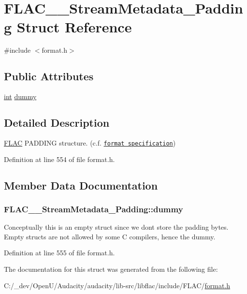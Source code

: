 \hypertarget{struct_f_l_a_c_____stream_metadata___padding}{}\section{F\+L\+A\+C\+\_\+\+\_\+\+Stream\+Metadata\+\_\+\+Padding Struct Reference}
\label{struct_f_l_a_c_____stream_metadata___padding}


{\ttfamily \#include $<$format.\+h$>$}

\subsection*{Public Attributes}
\begin{DoxyCompactItemize}
\item 
\hyperlink{xmltok_8h_a5a0d4a5641ce434f1d23533f2b2e6653}{int} \hyperlink{struct_f_l_a_c_____stream_metadata___padding_a5214437fcba7d6abdc3b2435dcaa4124}{dummy}
\end{DoxyCompactItemize}


\subsection{Detailed Description}
\hyperlink{namespace_f_l_a_c}{F\+L\+AC} P\+A\+D\+D\+I\+NG structure. (c.\+f. \href{../format.html#metadata_block_padding}{\tt format specification}) 

Definition at line 554 of file format.\+h.



\subsection{Member Data Documentation}
\subsubsection[{\texorpdfstring{dummy}{dummy}}]{ F\+L\+A\+C\+\_\+\+\_\+\+Stream\+Metadata\+\_\+\+Padding\+::dummy}\hypertarget{struct_f_l_a_c_____stream_metadata___padding_a5214437fcba7d6abdc3b2435dcaa4124}{}\label{struct_f_l_a_c_____stream_metadata___padding_a5214437fcba7d6abdc3b2435dcaa4124}
Conceptually this is an empty struct since we don\textquotesingle{}t store the padding bytes. Empty structs are not allowed by some C compilers, hence the dummy. 

Definition at line 555 of file format.\+h.



The documentation for this struct was generated from the following file\+:\begin{DoxyCompactItemize}
\item 
C\+:/\+\_\+dev/\+Open\+U/\+Audacity/audacity/lib-\/src/libflac/include/\+F\+L\+A\+C/\hyperlink{include_2_f_l_a_c_2format_8h}{format.\+h}\end{DoxyCompactItemize}
